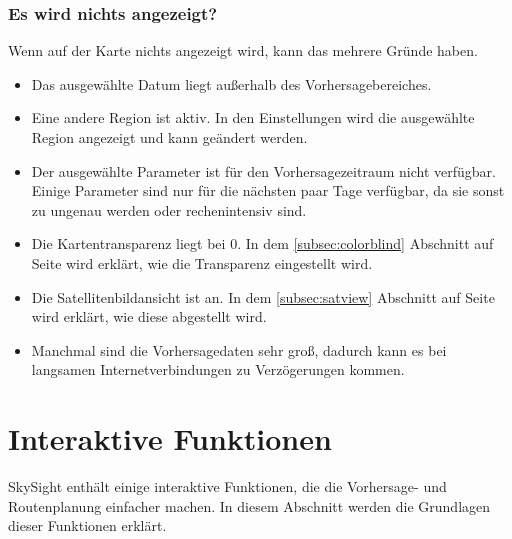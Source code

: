 \documentclass[11pt,a4paper]{article}
\begin{document}
\subsubsection{Es wird nichts angezeigt?}
Wenn auf der Karte nichts angezeigt wird, kann das mehrere Gründe haben.
\begin{itemize}
\item Das ausgewählte Datum liegt außerhalb des Vorhersagebereiches. 
\item Eine andere Region ist aktiv. In den Einstellungen wird die ausgewählte Region angezeigt und kann geändert werden.
\item Der ausgewählte Parameter ist für den Vorhersagezeitraum nicht verfügbar. Einige Parameter sind nur für die nächsten paar Tage verfügbar, da sie sonst zu ungenau werden oder rechenintensiv sind.
\item Die Kartentransparenz liegt bei 0. In dem \ref{subsec:colorblind} Abschnitt auf Seite \pageref{subsec:colorblind} wird erklärt, wie die Transparenz eingestellt wird.
\item Die Satellitenbildansicht ist an. In dem \ref {subsec:satview} Abschnitt auf Seite \pageref{subsec:satview} wird erklärt, wie diese abgestellt wird.
\item Manchmal sind die Vorhersagedaten sehr groß, dadurch kann es bei langsamen Internetverbindungen zu Verzögerungen kommen.
\end{itemize}

\section{Interaktive Funktionen}
SkySight enthält einige interaktive Funktionen, die die Vorhersage- und Routenplanung einfacher machen. In diesem Abschnitt werden die Grundlagen dieser Funktionen erklärt.
\end{document}
